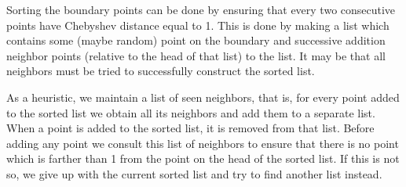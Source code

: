 \documentclass[reprint,amsmath,amssymb,aps,pre,showkeys,showpacs]{revtex4-1}
\begin{document}
Sorting the boundary points can be done by ensuring that every two consecutive
points have Chebyshev distance equal to 1. This is done by making a list which
contains some (maybe random) point on the boundary and successive addition
neighbor points (relative to the head of that list) to the list. It may be that
all neighbors must be tried to successfully construct the sorted list.

As a heuristic, we maintain a list of seen neighbors, that is, for every point
added to the sorted list we obtain all its neighbors and add them to a separate
list. When a point is added to the sorted list, it is removed from that
list. Before adding any point we consult this list of neighbors to ensure that
there is no point which is farther than 1 from the point on the head of the
sorted list. If this is not so, we give up with the current sorted list and try
to find another list instead.
\end{document}
